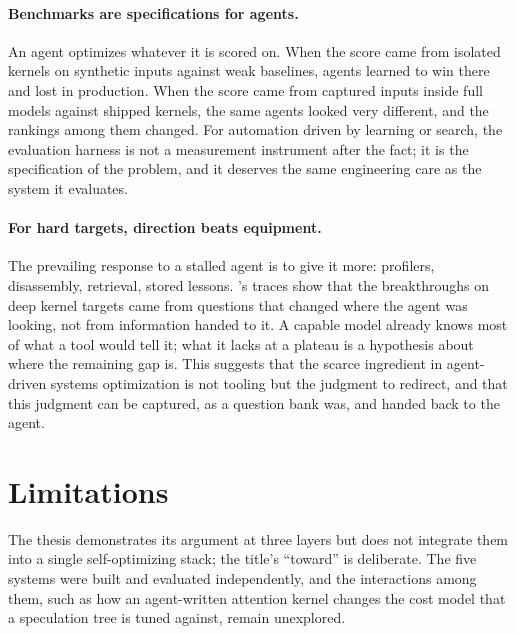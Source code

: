 \paragraph{Benchmarks are specifications for agents.}
An agent optimizes whatever it is scored on.
When the score came from isolated kernels on synthetic inputs against weak baselines, agents learned to win there and lost in production.
When the score came from captured inputs inside full models against shipped kernels, the same agents looked very different, and the rankings among them changed.
For automation driven by learning or search, the evaluation harness is not a measurement instrument after the fact; it is the specification of the problem, and it deserves the same engineering care as the system it evaluates.

\paragraph{For hard targets, direction beats equipment.}
The prevailing response to a stalled agent is to give it more: profilers, disassembly, retrieval, stored lessons.
\KernelSeek's traces show that the breakthroughs on deep kernel targets came from questions that changed where the agent was looking, not from information handed to it.
A capable model already knows most of what a tool would tell it; what it lacks at a plateau is a hypothesis about where the remaining gap is.
This suggests that the scarce ingredient in agent-driven systems optimization is not tooling but the judgment to redirect, and that this judgment can be captured, as a question bank was, and handed back to the agent.

\section{Limitations}
\label{conclusion:sec:limitations}

The thesis demonstrates its argument at three layers but does not integrate them into a single self-optimizing stack; the title's ``toward'' is deliberate.
The five systems were built and evaluated independently, and the interactions among them, such as how an agent-written attention kernel changes the cost model that a speculation tree is tuned against, remain unexplored.

